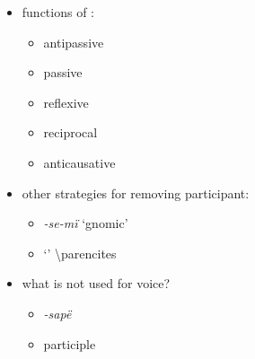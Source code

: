 \documentclass{memoir}
\begin{document}
\begin{itemize}
\tightlist
\item
  functions of :

  \begin{itemize}
  \tightlist
  \item
    antipassive
  \item
    passive
  \item
    reflexive
  \item
    reciprocal
  \item
    anticausative
  \end{itemize}
\item
  other strategies for removing participant:

  \begin{itemize}
  \tightlist
  \item
    \emph{-se-mï} `gnomic'
  \item
     `' \textbackslash parencites
  \end{itemize}
\item
  what is not used for voice?

  \begin{itemize}
  \tightlist
  \item
    \emph{-sapë}
  \item
    participle
  \end{itemize}
\end{itemize}

\printbibliography
\end{document}
